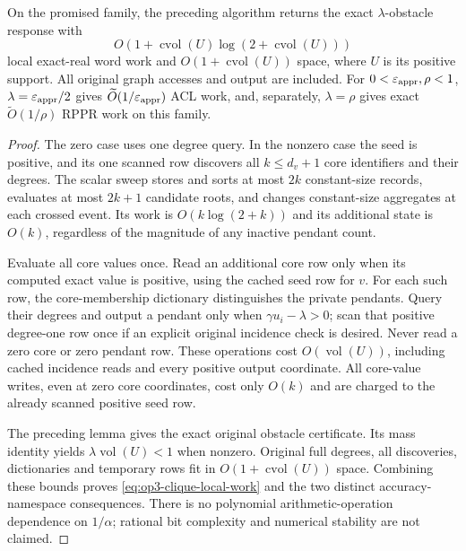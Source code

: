 \begin{theorem}
\label{thm:op3-local-clique-pendants}
On the promised family, the preceding algorithm returns the exact
$\lambda$-obstacle response with
\begin{equation}
 O\!\left(1+\operatorname{cvol}(U)
                  \log(2+\operatorname{cvol}(U))\right)
 \label{eq:op3-clique-local-work}
\end{equation}
local exact-real word work and $O(1+\operatorname{cvol}(U))$ space, where
$U$ is its positive support. All original graph accesses and output are
included. For $0<\varepsilon_{\mathrm{appr}},\rho<1$, $\lambda=\varepsilon_{\mathrm{appr}}/2$ gives
$\widetilde O(1/\varepsilon_{\mathrm{appr}})$ ACL work, and, separately, $\lambda=\rho$
gives exact $\widetilde O(1/\rho)$ RPPR work on this family.
\end{theorem}
\begin{proof}
The zero case uses one degree query. In the nonzero case the seed is
positive, and its one scanned row discovers all $k\leq d_v+1$ core
identifiers and their degrees. The scalar sweep stores and sorts at most
$2k$ constant-size records, evaluates at most $2k+1$ candidate roots, and
changes constant-size aggregates at each crossed event. Its work is
$O(k\log(2+k))$ and its additional state is $O(k)$, regardless of the
magnitude of any inactive pendant count.

Evaluate all core values once. Read an additional core row only when its
computed exact value is positive, using the cached seed row for $v$.
For each such row, the core-membership dictionary distinguishes the
private pendants. Query their degrees and output a pendant only when
$\gamma u_i-\lambda>0$; scan that positive degree-one row once if an
explicit original incidence check is desired. Never read a zero core or
zero pendant row. These operations cost $O(\operatorname{vol}(U))$,
including cached incidence reads and every positive output coordinate.
All core-value writes, even at zero core coordinates, cost only $O(k)$
and are charged to the already scanned positive seed row.

The preceding lemma gives the exact original obstacle certificate. Its
mass identity yields $\lambda\operatorname{vol}(U)<1$ when nonzero.
Original full degrees, all discoveries, dictionaries and temporary rows
fit in $O(1+\operatorname{cvol}(U))$ space. Combining these bounds proves
\cref{eq:op3-clique-local-work} and the two distinct accuracy-namespace
consequences. There is no polynomial arithmetic-operation dependence on
$1/\alpha$; rational bit complexity and numerical stability are not claimed.
\end{proof}

